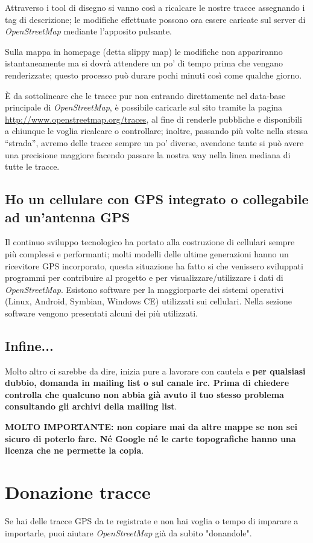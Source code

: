 \documentclass[a4paper,twoside,12pt,]{article}
\newcommand{\osm}{\emph{OpenStreetMap}\xspace}
\newcommand{\gps}{GPS\xspace}
\begin{document}
Attraverso i tool di disegno si vanno così a ricalcare le nostre tracce assegnando i tag di descrizione; le modifiche effettuate possono ora essere caricate sul server di \osm mediante l'apposito pulsante.

Sulla mappa in homepage (detta slippy map) le modifiche non appariranno istantaneamente ma si dovrà attendere un po' di tempo prima che vengano renderizzate; questo processo può durare pochi minuti così come qualche giorno.

È da sottolineare che le tracce pur non entrando direttamente nel data-base principale di \osm, è possibile caricarle sul sito tramite la pagina \url{http://www.openstreetmap.org/traces}, al fine di renderle pubbliche e disponibili a chiunque le voglia ricalcare o controllare; inoltre, passando più volte nella stessa ``strada'', avremo delle tracce sempre un po' diverse, avendone tante si può avere una precisione maggiore facendo passare la nostra way nella linea mediana di tutte le tracce.
\subsection{Ho un cellulare con \gps integrato o collegabile ad un'antenna \gps}
Il continuo sviluppo tecnologico ha portato alla costruzione di cellulari sempre più complessi e performanti; molti modelli delle ultime generazioni hanno un ricevitore \gps incorporato, questa situazione ha fatto si che venissero sviluppati programmi per contribuire al progetto e per visualizzare/utilizzare i dati di \osm. Esistono software per la maggiorparte dei sistemi operativi (Linux, Android, Symbian, Windows CE) utilizzati sui cellulari. Nella sezione software vengono presentati alcuni dei più utilizzati.

\subsection{Infine...}
Molto altro ci sarebbe da dire, inizia pure a lavorare con cautela e \textbf{per qualsiasi dubbio, domanda in mailing list o sul canale irc. Prima di chiedere controlla che qualcuno non abbia già avuto il tuo stesso problema consultando gli archivi della mailing list}.

\textbf{MOLTO IMPORTANTE: non copiare mai da altre mappe se non sei sicuro di poterlo fare. Né Google né le carte topografiche hanno una licenza che ne permette la copia}.

\section{Donazione tracce}
Se hai delle tracce \gps da te registrate e non hai voglia o tempo di imparare a importarle, puoi aiutare \osm già da subito "donandole".
\end{document}
